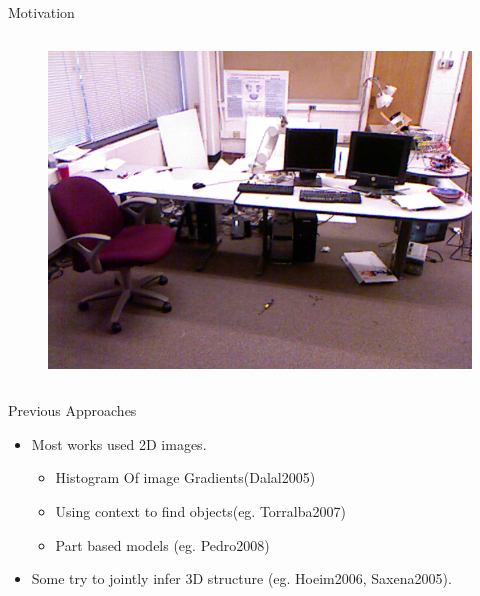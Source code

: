 \documentclass{beamer}
\begin{document}
\begin{frame}{Motivation}
\begin{columns}
\begin{figure}
		\includegraphics[width=1.1\linewidth]{scene2.png}
		\end{figure}
	\end{columns}
\end{frame}


\begin{frame}{Previous Approaches}

	\begin{itemize}
		\item Most works used 2D images.
	\begin{itemize}
		\item Histogram Of image Gradients(Dalal2005)
		\item Using context to find objects(eg. Torralba2007)
		\item Part based models (eg. Pedro2008)

	\end{itemize}

		\item Some try to jointly infer 3D structure (eg. Hoeim2006, Saxena2005).
	\end{itemize}

\end{frame}
\end{document}
